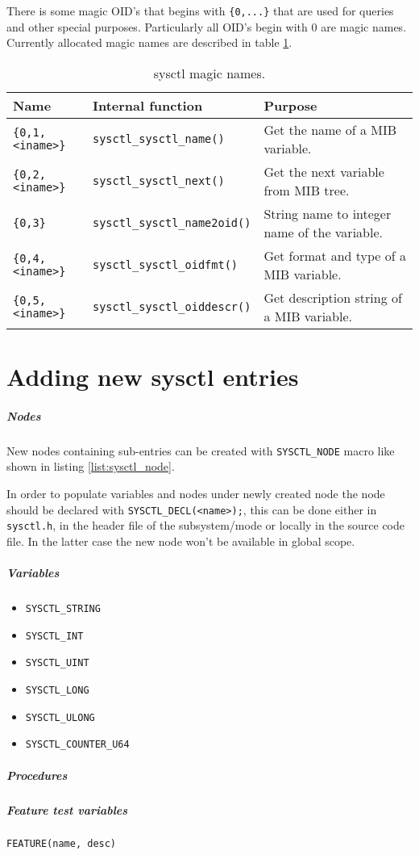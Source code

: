 There is some magic OID's that begins with \verb+{0,...}+ that are used for
queries and other special purposes. Particularly all OID's begin with 0 are
magic names. Currently allocated magic names are described in table
\ref{table:sysctlmagic}.

\begin{table}
\caption{sysctl magic names.}
\label{table:sysctlmagic}
\begin{tabular}{lll}
Name                & Internal function        & Purpose\\
\hline
\verb+{0,1,<iname>}+ & \verb+sysctl_sysctl_name()+     & Get the name of a MIB variable.\\
\verb+{0,2,<iname>}+ & \verb+sysctl_sysctl_next()+     & Get the next variable from MIB tree.\\
\verb+{0,3}+            & \verb+sysctl_sysctl_name2oid()+ & String name to integer name of the variable.\\
\verb+{0,4,<iname>}+ & \verb+sysctl_sysctl_oidfmt()+   & Get format and type of a MIB variable.\\
\verb+{0,5,<iname>}+ & \verb+sysctl_sysctl_oiddescr()+ & Get description string of a MIB variable.
\end{tabular}
\end{table}

\section{Adding new sysctl entries}

\subparagraph{Nodes}
New nodes containing sub-entries can be created with \verb+SYSCTL_NODE+ macro
like shown in listing \ref{list:sysctl_node}.



In order to populate variables and nodes under newly created node the node
should be declared with \verb+SYSCTL_DECL(<name>);+, this can be done either in
\verb+sysctl.h+, in the header file of the subsystem/mode or locally in the
source code file. In the latter case the new node won't be available in
global scope.

\subparagraph{Variables}
\begin{itemize}
\item \verb+SYSCTL_STRING+
\item \verb+SYSCTL_INT+
\item \verb+SYSCTL_UINT+
\item \verb+SYSCTL_LONG+
\item \verb+SYSCTL_ULONG+
\item \verb+SYSCTL_COUNTER_U64+
\end{itemize}

\subparagraph{Procedures}


\subparagraph{Feature test variables}
\verb+FEATURE(name, desc)+
